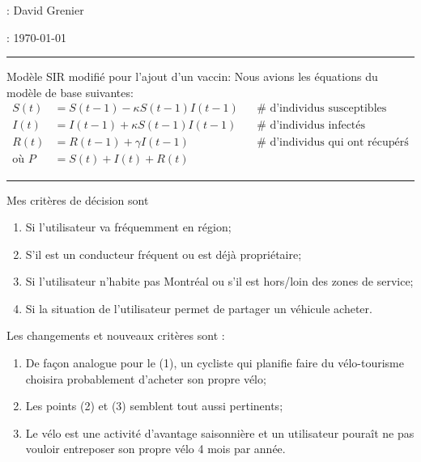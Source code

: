 \documentclass[12pt]{article}
\begin{document}


\medskip
{} : David Grenier

 : \today

\bigskip
\bigskip

\hrule height0.3pt
\bigskip

 Mod\`ele SIR modifi\'e pour l'ajout d'un vaccin:
Nous avions les \'equations du mod\`ele de base suivantes:
\begin{align*}
    S(t) &= S(t-1) - \kappa S(t-1)I(t-1) &&\text{# d'individus susceptibles}\\
    I(t) &= I(t-1) + \kappa S(t-1)I(t-1) &&\text{# d'individus infect\'es}\\
    R(t) &= R(t-1) + \gamma I(t-1) &&\text{# d'individus qui ont r\'ecup\'er\'s}\\
    \text{o\`u } P &= S(t) + I(t) + R(t)
\end{align*}

\bigskip

\hrule height0.3pt
\bigskip

 Mes crit\`eres de d\'ecision sont 
\begin{enumerate}
    \item Si l'utilisateur va fr\'equemment en r\'egion;
    \item S'il est un conducteur fr\'equent ou est d\'ej\`a propri\'etaire;
    \item Si l'utilisateur n'habite pas Montr\'eal ou s'il est hors/loin des zones de service;
    \item Si la situation de l'utilisateur permet de partager un v\'ehicule acheter.
\end{enumerate}

\medskip

 Les changements et nouveaux crit\`eres sont : 
\begin{enumerate}
    \item De fa\c con analogue pour le (1), un cycliste qui planifie faire du v\'elo-tourisme
        choisira probablement d'acheter son propre v\'elo;
    \item Les points (2) et (3) semblent tout aussi pertinents;
    \item Le v\'elo est une activit\'e d'avantage saisonni\`ere
        et un utilisateur poura\^it ne pas vouloir entreposer son propre v\'elo 4 mois par ann\'ee.
\end{enumerate}
\end{document}
